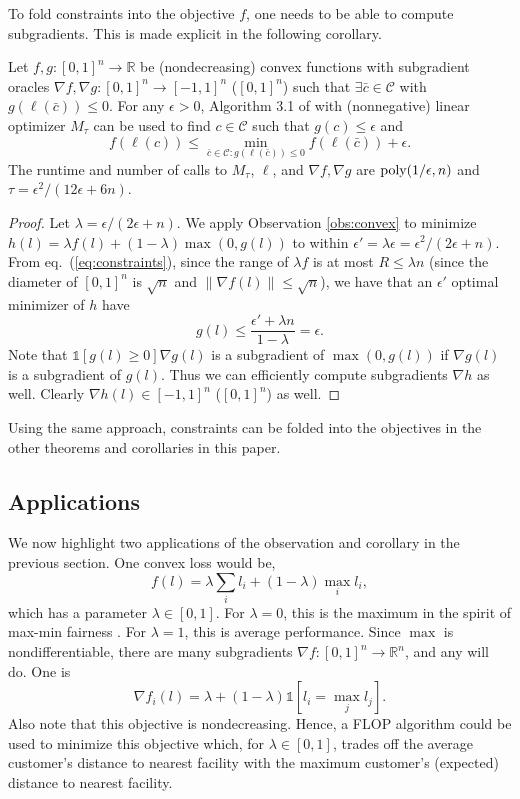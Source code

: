 \documentclass[final, 12pt]{colt2018} %
\def\reals{{\mathbb R}}
\newcommand{\eps}{\epsilon}
\def\calC{\mathcal{C}}
\newcommand{\poly}{\mathop{\mbox{\text{poly}}}}
\newcommand{\ind}{\mathds{1}}
\begin{document}
To fold constraints into the objective $f$, one needs to be able to compute subgradients. This is made explicit in the following corollary. 
\begin{corollary}\label{cor:constrained}
Let $f, g:[0,1]^n\rightarrow \reals$ be (nondecreasing) convex functions with subgradient oracles $\nabla f, \nabla g:[0,1]^n \rightarrow [-1,1]^n$ ($[0,1]^n$) such that $\exists \bar{c}\in \calC$ with $g(\ell(\bar{c})) \leq 0$. For any $\eps>0$, Algorithm 3.1 of \cite{KakadeKL09} with (nonnegative) linear optimizer $M_\tau$ can be used to find $c \in \calC$ such that $g(c)\leq \eps$ and 
$$f(\ell(c)) \leq \min_{\bar{c} \in \calC: g(\ell(\bar{c}))\leq 0} f(\ell(\bar{c})) + \eps.$$
The runtime and number of calls to $M_\tau$, $\ell$, and $\nabla f, \nabla g$ are $\poly(1/\eps, n)$ and $\tau=\eps^2/(12\eps + 6n)$.
\end{corollary}
\begin{proof}
Let $\lambda = \eps/(2\eps+n)$. We apply Observation \ref{obs:convex} to minimize $h(l)= \lambda f(l)+(1-\lambda) \max(0, g(l))$ to within $\eps'=\lambda \eps = \eps^2/(2\eps + n)$.
From eq.~(\ref{eq:constraints}), since the range of $\lambda f$ is at most $R \leq \lambda n$  (since the diameter of $[0,1]^n$ is $\sqrt{n}$ and $\|\nabla f(l)\| \leq \sqrt{n}$), we have that
an $\eps'$ optimal minimizer of $h$ have $$g(l) \leq \frac{\eps' + \lambda n}{1-\lambda} = \eps.$$
Note that $\ind[g(l) \geq 0]\nabla g(l)$ is a subgradient of $\max(0, g(l))$ if $\nabla g(l)$ is a subgradient of $g(l)$. Thus we can efficiently compute subgradients $\nabla h$ as well. Clearly $\nabla h(l) \in [-1,1]^n$ ($[0,1]^n$) as well.
\end{proof}
Using the same approach, constraints can be folded into the objectives in the other theorems and corollaries in this paper.

\subsection{Applications}

We now highlight two applications of the observation and corollary in the previous section. One convex loss would be,
$$f(l) = \lambda \sum_i l_i + (1-\lambda) \max_i l_i,$$
which has a parameter $\lambda \in [0,1]$. For $\lambda =0$, this is the maximum in the spirit of max-min fairness \cite{rawls1971theory}. For $\lambda =1$, this is average performance.  Since $\max$ is nondifferentiable, there are many subgradients $\nabla f: [0,1]^n\rightarrow \reals^n$, and any will do. One is 
$$\nabla f_i(l)=\lambda + (1-\lambda) \ind\left[l_i =\max_j l_j\right].$$
Also note that this objective is nondecreasing. Hence, a FLOP algorithm could be used to minimize this objective which, for $\lambda \in [0,1]$, trades off the average customer's distance to nearest facility with the maximum customer's (expected) distance to nearest facility.
\end{document}
